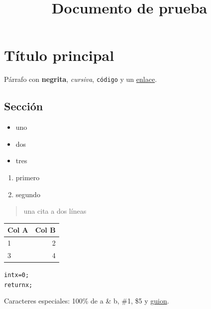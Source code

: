 \documentclass[11pt]{article}
\title{Documento de prueba}
\author{}
\date{}
\begin{document}
\maketitle
\section{Título principal}
Párrafo con \textbf{negrita}, \textit{cursiva}, \texttt{código} y un \href{http://e.com}{enlace}.

\subsection{Sección}
\begin{itemize}
\item uno
\item dos
\item tres
\end{itemize}
\begin{enumerate}
\item primero
\item segundo
\end{enumerate}
\begin{quote}
una cita a dos líneas

\end{quote}
\begin{tabular}{lr}
\hline
Col A & \textbf{Col B} \\
\hline
1 & 2 \\
\hline
3 & 4 \\
\hline
\end{tabular}

\begin{alltt}
int x = 0;
return x;
\end{alltt}
Caracteres especiales: 100\% de a \& b, \#1, \$5 y \uline{guion}.
\end{document}
